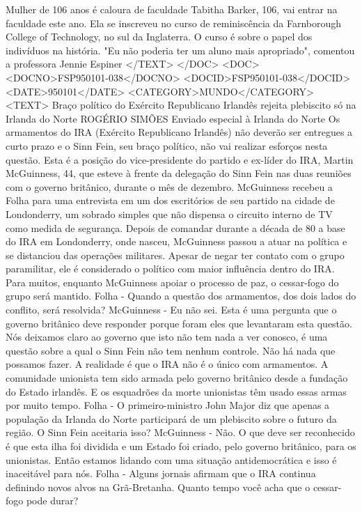 Mulher de 106 anos é caloura de faculdade 
Tabitha Barker, 106, vai entrar na faculdade este ano. Ela se inscreveu no curso de reminiscência da Farnborough College of Technology, no sul da Inglaterra. O curso é sobre o papel dos indivíduos na história. "Eu não poderia ter um aluno mais apropriado", comentou a professora Jennie Espiner
</TEXT>
</DOC>
<DOC>
<DOCNO>FSP950101-038</DOCNO>
<DOCID>FSP950101-038</DOCID>
<DATE>950101</DATE>
<CATEGORY>MUNDO</CATEGORY>
<TEXT>
Braço político do Exército Republicano Irlandês rejeita plebiscito só na Irlanda do Norte 
ROGÉRIO SIMÕES 
Enviado especial à Irlanda do Norte 
Os armamentos do IRA (Exército Republicano Irlandês) não deverão ser entregues a curto prazo e o Sinn Fein, seu braço político, não vai realizar esforços nesta questão.
Esta é a posição do vice-presidente do partido e ex-líder do IRA, Martin McGuinness, 44, que esteve à frente da delegação do Sinn Fein nas duas reuniões com o governo britânico, durante o mês de dezembro.
McGuinness recebeu a Folha para uma entrevista em um dos escritórios de seu partido na cidade de Londonderry, um sobrado simples que não dispensa o circuito interno de TV como medida de segurança.
Depois de comandar durante a década de 80 a base do IRA em Londonderry, onde nasceu, McGuinness passou a atuar na política e se distanciou das operações militares.
Apesar de negar ter contato com o grupo paramilitar, ele é considerado o político com maior influência dentro do IRA. Para muitos, enquanto McGuinness apoiar o processo de paz, o cessar-fogo do grupo será mantido.
 Folha - Quando a questão dos armamentos, dos dois lados do conflito, será resolvida?
McGuinness - Eu não sei. Esta é uma pergunta que o governo britânico deve responder porque foram eles que levantaram esta questão. Nós deixamos claro ao governo que isto não tem nada a ver conosco, é uma questão sobre a qual o Sinn Fein não tem nenhum controle. Não há nada que possamos fazer.
A realidade é que o IRA não é o único com armamentos. A comunidade unionista tem sido armada pelo governo britânico desde a fundação do Estado irlandês. E os esquadrões da morte unionistas têm usado essas armas por muito tempo.
Folha - O primeiro-ministro John Major diz que apenas a população da Irlanda do Norte participará de um plebiscito sobre o futuro da região. O Sinn Fein aceitaria isso?
McGuinness - Não. O que deve ser reconhecido é que esta ilha foi dividida e um Estado foi criado, pelo governo britânico, para os unionistas. Então estamos lidando com uma situação antidemocrática e isso é inaceitável para nós.
Folha - Alguns jornais afirmam que o IRA continua definindo novos alvos na Grã-Bretanha. Quanto tempo você acha que o cessar-fogo pode durar?
